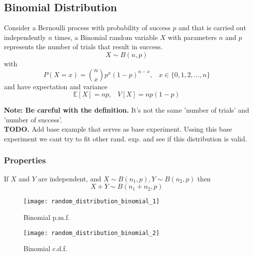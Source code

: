 \subsection{Binomial Distribution}
Consider a Bernoulli process with probability of success $p$ and that is carried out independently $n$ times, a Binomial random variable 
$X$ with parameters $n$ and $p$ represents the number of trials that result in success.
\[ X \sim B(n, p) \]
with
\[ P(X=x) = \binom{n}{x}p^x(1-p)^{n-x},\;\;\; x \in \{0,1,2,\dots,n\} \]
and have expectation and variance
\[ \mathbb{E}[X] = np,\;\;\; V[X] = np(1-p) \]

\textbf{Note: Be careful with the definition.} It's not the same 'number of trials' and 'number of success'.\\
\textbf{TODO.} Add base example that serves as base experiment. Ussing this base experiment we cant try to fit other rand. exp. and see
if this distribution is valid.


\subsubsection{Properties}
If $X$ and $Y$ are independent, and $X \sim B(n_1, p), Y \sim B(n_2, p)$ then 
\[ X+Y \sim B(n_1+n_2, p) \]

\begin{figure}[!ht]
    \begin{minipage}{0.45\linewidth}
      \texttt{[image: random\_distribution\_binomial\_1]}
      \caption{Binomial p.m.f.}
    \end{minipage}
    \hfill
    \begin{minipage}{0.45\linewidth}
      \texttt{[image: random\_distribution\_binomial\_2]}
      \caption{Binomial c.d.f.}
    \end{minipage}
\end{figure}

